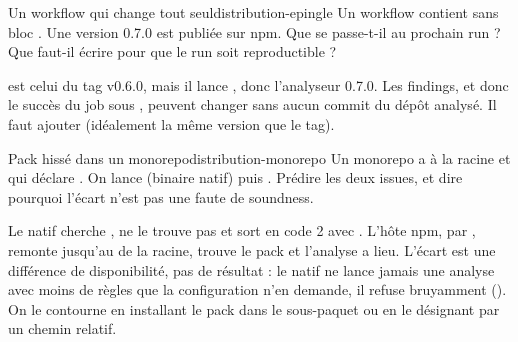 \begin{exercice}{Un workflow qui change tout seul}{distribution-epingle}
Un workflow contient  sans bloc . Une version 0.7.0 est publiée sur npm. Que se passe-t-il au prochain run ? Que faut-il écrire pour que le run soit reproductible ?
\end{exercice}
\begin{solution}
 est celui du tag v0.6.0, mais il lance , donc l'analyseur 0.7.0. Les findings, et donc le succès du job sous , peuvent changer sans aucun commit du dépôt analysé. Il faut ajouter  (idéalement la même version que le tag).
\end{solution}

\begin{exercice}{Pack hissé dans un monorepo}{distribution-monorepo}
Un monorepo a  à la racine et  qui déclare . On lance  (binaire natif) puis . Prédire les deux issues, et dire pourquoi l'écart n'est pas une faute de soundness.
\end{exercice}
\begin{solution}
Le natif cherche , ne le trouve pas et sort en code 2 avec . L'hôte npm, par , remonte jusqu'au  de la racine, trouve le pack et l'analyse a lieu. L'écart est une différence de disponibilité, pas de résultat : le natif ne lance jamais une analyse avec moins de règles que la configuration n'en demande, il refuse bruyamment (). On le contourne en installant le pack dans le sous-paquet ou en le désignant par un chemin relatif.
\end{solution}
